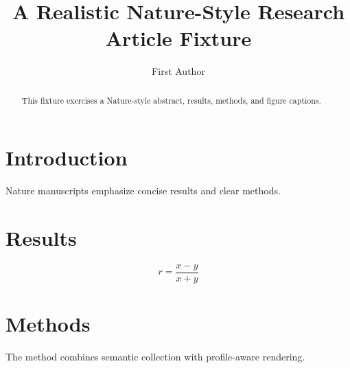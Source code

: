 \documentclass{nature}
\begin{document}
\title{A Realistic Nature-Style Research Article Fixture}
\author{First Author}
\begin{abstract}
This fixture exercises a Nature-style abstract, results, methods, and figure captions.
\end{abstract}
\section{Introduction}
Nature manuscripts emphasize concise results and clear methods.
\section{Results}
\begin{equation}
  r = \frac{x-y}{x+y}
\end{equation}
\section{Methods}
The method combines semantic collection with profile-aware rendering.

\end{document}
